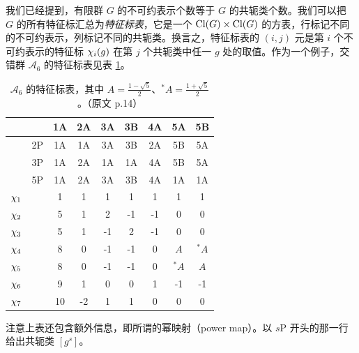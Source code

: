 

我们已经提到，有限群 $G$ 的不可约表示个数等于 $G$ 的共轭类个数。我们可以把 $G$ 的所有特征标汇总为\emph{特征标表}，它是一个 $\text{Cl}(G)\times\text{Cl}(G)$ 的方表，行标记不同的不可约表示，列标记不同的共轭类。换言之，特征标表的 $(i,j)$ 元是第 $i$ 个不可约表示的特征标 $\chi_i(g)$ 在第 $j$ 个共轭类中任一 $g$ 处的取值。作为一个例子，交错群 $\mathcal{A}_6$ 的特征标表见表 \ref{tbl:char_table_ex}。
\begin{table}
\centering
\begin{tabular}{|c|c|c|c|c|c|c|c|c|}
\hline    &    & 1A & 2A & 3A & 3B & 4A & 5A & 5B \\ \hline \hline
          & 2P & 1A & 1A & 3A & 3B & 2A & 5B & 5A \\ \hline
          & 3P & 1A & 2A & 1A & 1A & 4A & 5B & 5A \\ \hline
          & 5P & 1A & 2A & 3A & 3B & 4A & 1A & 1A \\ \hline  \hline
$\chi_1$    &    &  1 &  1 &  1 &  1 & 1 & 1 & 1 \\ \hline
$\chi_2$    &    &  5 &  1 &  2 & -1 &-1 & 0 & 0 \\ \hline
$\chi_3$    &    &  5 &  1 & -1 &  2 &-1 & 0 & 0 \\ \hline
$\chi_4$    &    &  8 &  0 & -1 & -1 & 0 &$A$& $^*A$ \\ \hline
$\chi_5$    &    &  8 &  0 & -1 & -1 & 0 &$^*A$& $A$ \\ \hline
$\chi_6$    &    &  9 &  1 &  0 &  0 & 1 &-1 &-1 \\ \hline
$\chi_7$    &    & 10 & -2 &  1 &  1 & 0 & 0 & 0 \\ \hline
\end{tabular}
\caption{$\mathcal{A}_6$ 的特征标表，其中 $A=\frac{1-\sqrt{5}}{2}$、$^*A=\frac{1+\sqrt{5}}{2}$。（原文 p.14）}
\label{tbl:char_table_ex}
\end{table}
注意上表还包含额外信息，即所谓的幂映射（power map）。以 $s$P 开头的那一行给出共轭类 $[g^s]$。

